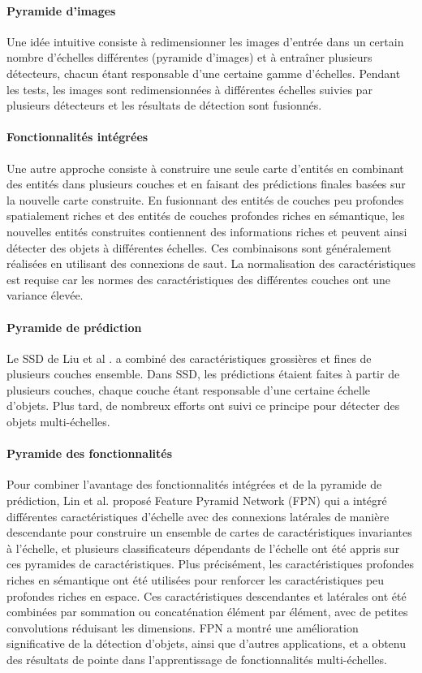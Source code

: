      \paragraph{Pyramide d'images} Une idée intuitive consiste à redimensionner les images d'entrée dans un certain nombre d'échelles différentes (pyramide d'images) et à entraîner plusieurs détecteurs, chacun étant responsable d'une certaine gamme d'échelles. Pendant les tests, les images sont redimensionnées à différentes échelles suivies par plusieurs détecteurs et les résultats de détection sont fusionnés.
     \paragraph{Fonctionnalités intégrées} Une autre approche consiste à construire une seule carte d'entités en combinant des entités dans plusieurs couches et en faisant des prédictions finales basées sur la nouvelle carte construite. En fusionnant des entités de couches peu profondes spatialement riches et des entités de couches profondes riches en sémantique, les nouvelles entités construites contiennent des informations riches et peuvent ainsi détecter des objets à différentes échelles. Ces combinaisons sont généralement réalisées en utilisant des connexions de saut. La normalisation des caractéristiques est requise car les normes des caractéristiques des différentes couches ont une variance élevée.
     \paragraph{Pyramide de prédiction} Le SSD de Liu et al \cite{ssd_paper}. a combiné des caractéristiques grossières et fines de plusieurs couches ensemble. Dans SSD, les prédictions étaient faites à partir de plusieurs couches, chaque couche étant responsable d'une certaine échelle d'objets. Plus tard, de nombreux efforts ont suivi ce principe pour détecter des objets multi-échelles.
     \paragraph{Pyramide des fonctionnalités} Pour combiner l'avantage des fonctionnalités intégrées et de la pyramide de prédiction, Lin et al. proposé Feature Pyramid Network (FPN) \cite{fpn_paper} qui a intégré différentes caractéristiques d'échelle avec des connexions latérales de manière descendante pour construire un ensemble de cartes de caractéristiques invariantes à l'échelle, et plusieurs classificateurs dépendants de l'échelle ont été appris sur ces pyramides de caractéristiques. Plus précisément, les caractéristiques profondes riches en sémantique ont été utilisées pour renforcer les caractéristiques peu profondes riches en espace. Ces caractéristiques descendantes et latérales ont été combinées par sommation ou concaténation élément par élément, avec de petites convolutions réduisant les dimensions. FPN a montré une amélioration significative de la détection d'objets, ainsi que d'autres applications, et a obtenu des résultats de pointe dans l'apprentissage de fonctionnalités multi-échelles.

